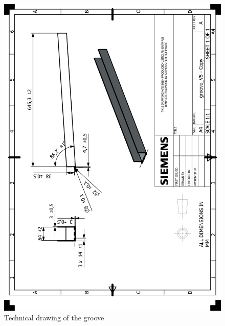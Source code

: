 \documentclass[12pt]{article}
\begin{document}
\begin{appendices}
\begin{figure}[H]
    \centering
    \includegraphics[width=\textwidth]{HP_groove_V5 - Copy.png} 
    \caption{Technical drawing of the groove}
    \label{fig:technical-drawing}
\end{figure}


\end{appendices}
\end{document}
